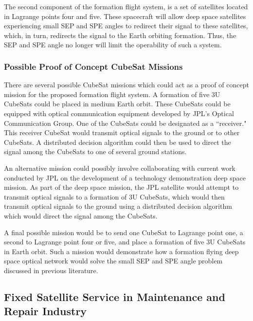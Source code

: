The second component of the formation flight system, is a set of satellites located in Lagrange points four and five. These spacecraft will allow deep space satellites experiencing small SEP and SPE angles to redirect their signal to these satellites, which, in turn, redirects the signal to the Earth orbiting formation. Thus, the SEP and SPE angle no longer will limit the operability of such a system.

\subsubsection{Possible Proof of Concept CubeSat Missions}
There are several possible CubeSat missions which could act as a proof of concept mission for the proposed formation flight system. A formation of five 3U CubeSats could be placed in medium Earth orbit. These CubeSats could be equipped with optical communication equipment developed by JPL's Optical Communication Group. One of the CubeSats could be designated as a ``receiver." This receiver CubeSat would transmit optical signals to the ground or to other CubeSats. A distributed decision algorithm could then be used to direct the signal among the CubeSats to one of several ground stations.

An alternative mission could possibly involve collaborating with current work conducted by JPL on the development of a technology demonstration deep space mission. As part of the deep space mission, the JPL satellite would attempt to transmit optical signals to a formation of 3U CubeSats, which would then transmit optical signals to the ground using a distributed decision algorithm which would direct the signal among the CubeSats. 

A final possible mission would be to send one CubeSat to Lagrange point one, a second to Lagrange point four or five, and place a formation of five 3U CubeSats in Earth orbit. Such a mission would demonstrate how a formation flying deep space optical network would solve the small SEP and SPE angle problem discussed in previous literature.




\subsection{Fixed Satellite Service in Maintenance and Repair Industry}
